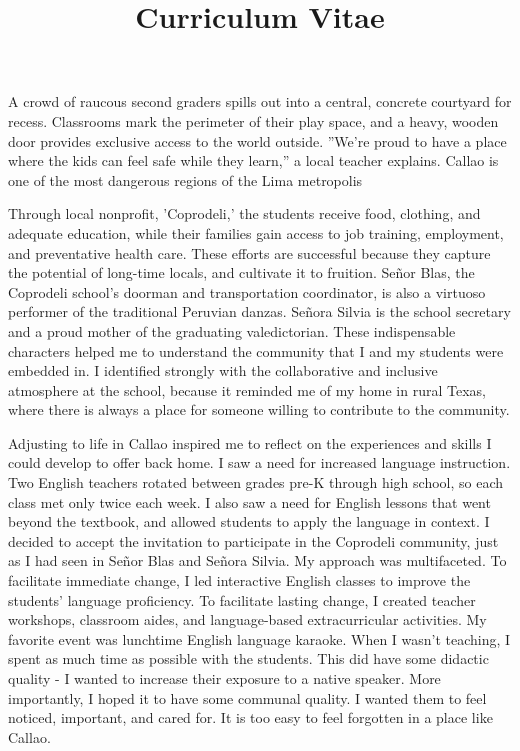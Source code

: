 \documentclass[12pt,a4paper,roman]{moderncv} %
\title{Curriculum Vitae}
\begin{document}


\clearpage


A crowd of raucous second graders spills out into a central, concrete courtyard for recess. Classrooms mark the perimeter of their play space, and a heavy, wooden door provides exclusive access to the world outside. ''We're proud to have a place where the kids can feel safe while they learn,'' a local teacher explains. Callao is one of the most dangerous regions of the Lima metropolis

\medskip
 
Through local nonprofit, 'Coprodeli,' the students receive food, clothing, and adequate education, while their families gain access to job training, employment, and preventative health care. These efforts are successful because they capture the potential of long-time locals, and cultivate it to fruition. Se\~nor Blas, the Coprodeli school's doorman and transportation coordinator, is also a virtuoso performer of the traditional Peruvian danzas. Se\~nora Silvia is the school secretary and a proud mother of the graduating valedictorian. These indispensable characters helped me to understand the community that I and my students were embedded in. I identified strongly with the collaborative and inclusive atmosphere at the school, because it reminded me of my home in rural Texas, where there is always a place for someone willing to contribute to the community.

\medskip

Adjusting to life in Callao inspired me to reflect on the experiences and skills I could develop to offer back home. I saw a need for increased language instruction. Two English teachers rotated between grades pre-K through high school, so each class met only twice each week. I also saw a need for English lessons that went beyond the textbook, and allowed students to apply the language in context. I decided to accept the invitation to participate in the Coprodeli community, just as I had seen in Se\~nor Blas and Se\~nora Silvia.  My approach was multifaceted. To facilitate immediate change, I led interactive English classes to improve the students' language proficiency. To facilitate lasting change, I created teacher workshops, classroom aides, and language-based extracurricular activities. My favorite event was lunchtime English language karaoke. When I wasn't teaching, I spent as much time as possible with the students. This did have some didactic quality - I wanted to increase their exposure to a native speaker. More importantly, I hoped it to have some communal quality. I wanted them to feel noticed, important, and cared for. It is too easy to feel forgotten in a place like Callao.
\end{document}
